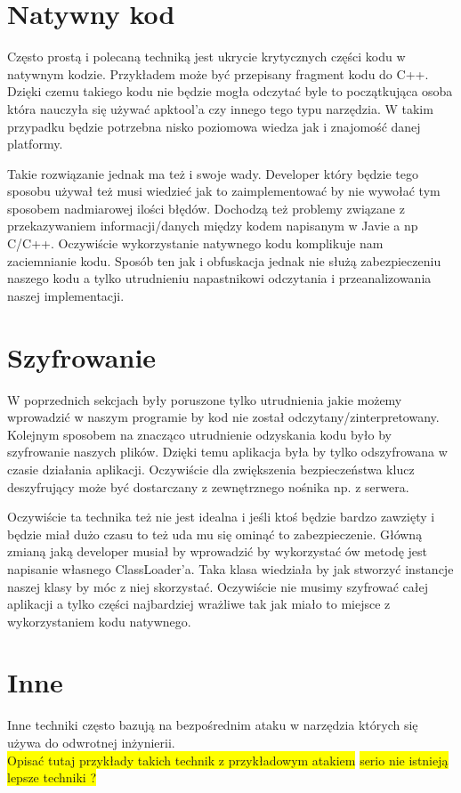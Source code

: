 \documentclass[12pt,a4paper,leqno,oneside,titlepage]{book}
\newcommand{\todo}[1]{\colorbox{yellow}{#1}}
\begin{document}
\section{Natywny kod}
Często prostą i polecaną techniką jest ukrycie krytycznych części kodu w natywnym kodzie. Przykładem może być przepisany fragment kodu do C++. Dzięki czemu takiego kodu nie będzie mogła odczytać byle to początkująca osoba która nauczyła się używać apktool'a czy innego tego typu narzędzia. W takim przypadku będzie potrzebna nisko poziomowa wiedza jak i znajomość danej platformy.\par
Takie rozwiązanie jednak ma też i swoje wady. Developer który będzie tego sposobu używał też musi wiedzieć jak to zaimplementować by nie wywołać tym sposobem nadmiarowej ilości błędów. Dochodzą też problemy związane z przekazywaniem informacji/danych między kodem napisanym w Javie a np C/C++. Oczywiście wykorzystanie natywnego kodu komplikuje nam zaciemnianie kodu. Sposób ten jak i obfuskacja jednak nie służą zabezpieczeniu naszego kodu a tylko utrudnieniu napastnikowi odczytania i przeanalizowania naszej implementacji.

\section{Szyfrowanie}
W poprzednich sekcjach były poruszone tylko utrudnienia jakie możemy wprowadzić w naszym programie by kod nie został odczytany/zinterpretowany. Kolejnym sposobem na znacząco utrudnienie odzyskania kodu było by szyfrowanie naszych plików. Dzięki temu aplikacja była by tylko odszyfrowana w czasie działania aplikacji. Oczywiście dla zwiększenia bezpieczeństwa klucz deszyfrujący może być dostarczany z zewnętrznego nośnika np. z serwera.
\par
Oczywiście ta technika też nie jest idealna i jeśli ktoś będzie bardzo zawzięty i będzie miał dużo czasu to też uda mu się ominąć to zabezpieczenie. Główną zmianą jaką developer musiał by wprowadzić by wykorzystać ów metodę jest napisanie własnego ClassLoader'a. Taka klasa wiedziała by jak stworzyć instancje naszej klasy by móc z niej skorzystać. Oczywiście nie musimy szyfrować całej aplikacji a tylko części najbardziej wrażliwe tak jak miało to miejsce z wykorzystaniem kodu natywnego.

\section{Inne}
Inne techniki często bazują na bezpośrednim ataku w narzędzia których się używa do odwrotnej inżynierii.
\\
\todo{Opisać tutaj przykłady takich technik z przykładowym atakiem}
\todo{serio nie istnieją lepsze techniki ?}
\end{document}
